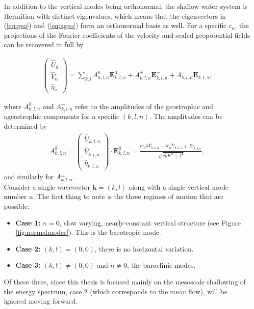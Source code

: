 In addition to the vertical modes being orthonormal, the shallow water system is Hermitian with distinct eigenvalues, which means that the eigenvectors in (\ref{eq:geo}) and (\ref{eq:ageo}) form an orthonormal basis as well. For a specific $c_n$, the projections of the Fourier coefficients of the velocity and scaled geopotential fields can be recovered in full by

\begin{align}
\left(\begin{array}{c}
\widehat{U}_n\\
\widehat{V}_n\\
\widehat{\eta}_n\end{array}\right)=
\sum_{k,l} A^0_{k,l,n} \mathbf{E}^0_{k,l,n} + A^+_{k,l,n} \mathbf{E}^+_{k,l,n} + A^-_{k,l,n} \mathbf{E}^-_{k,l,n},
\end{align}

where $A^0_{k,l,n}$ and $A^\pm_{k,l,n}$ refer to the amplitudes of the geostrophic and ageostrophic components for a specific $(k,l,n)$. The amplitudes can be determined by 
\begin{align}
A^0_{k,l,n} = \left(\begin{array}{c}
\widehat{U}_{k,l,n}\\
\widehat{V}_{k,l,n}\\
\widehat{\eta}_{k,l,n}\end{array}\right) \cdot \mathbf{E}^0_{k,l,n} = \frac{ic_nk\widehat{V}_{k,l,n} - ic_n \widehat{U}_{k,l,n} + f\widehat{\eta}_{k,l,n}}{\sqrt{c^2_nK^2 + f^2}}, \label{eq:amplitudes}
\end{align}
and similarly for $A^\pm_{k,l,n}$.\\

Consider a single wavevector $\mathbf{k} = (k, l)$ along with a single vertical mode number $n$. The first thing to note is the three regimes of motion that are possible:

\begin{itemize}
\item[] \textbf{Case 1:} $n = 0$, slow varying, nearly-constant vertical structure (see Figure \ref{fig:normalmodes}). This is the barotropic mode.
\item[] \textbf{Case 2:} $(k,l) = (0,0)$, there is no horizontal variation.
\item[] \textbf{Case 3:} $(k,l) \neq (0,0)$ and $n \neq 0$, the baroclinic modes.
\end{itemize}

Of these three, since this thesis is focused mainly on the mesoscale shallowing of the energy spectrum, case 2 (which corresponds to the mean flow), will be ignored moving forward.\\

